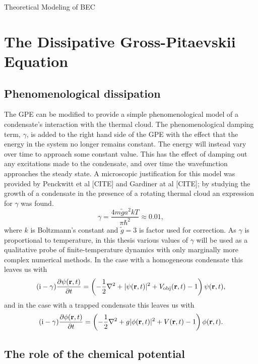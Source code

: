\begin{chapter}{\label{cha:theoretical_model}Theoretical Modeling of BEC}
\section{\label{section:gpe} The Dissipative Gross-Pitaevskii Equation}
	\subsection{\label{section:gamma} Phenomenological dissipation}
	The GPE can be modified to provide a simple phenomenological model of a condensate's interaction with the thermal cloud. The phenomenological damping term, $\gamma$, is added to the right hand side of the GPE with the effect that the energy in the system no longer remains constant. The energy will instead vary over time to approach some constant value. This has the effect of damping out any excitations made to the condensate, and over time the wavefunction approaches the steady state. A microscopic justification for this model was provided by Penckwitt et al [CITE] and Gardiner at al [CITE]; by studying the growth of a condensate in the presence of a rotating thermal cloud an expression for $\gamma$ was found.
		\begin{equation}\label{eq:dissgamma}
		\gamma = \frac{4m\tilde{g}a^2kT}{\pi\hbar^2} \approx 0.01,
		\end{equation}
	where $k$ is Boltzmann's constant and $\tilde{g} = 3$ is factor used for correction. As $\gamma$ is proportional to temperature, in this thesis various values of $\gamma$ will be used as a qualitative probe of finite-temperature dynamics with only marginally more complex numerical methods.
	In the case with a homogeneous condensate this leaves us with
		\begin{equation}\label{eq:dissgpehomg}
		(\mathrm{i} - \gamma)\frac{\partial\psi({\bf r},t)}{\partial t} = \left( -\frac{1}{2}\nabla^2 + |\psi({\bf r},t)|^2 + V_{\mathrm{obj}}({\bf r},t) - 1 \right) \psi({\bf r},t),
		\end{equation}
	and in the case with a trapped condensate this leaves us with
		\begin{equation}\label{eq:dissgpetrapped}
		(\mathrm{i}-\gamma)\frac{\partial\phi({\bf r},t)}{\partial t} = \left( -\frac{1}{2}\nabla^2 + g|\phi({\bf r},t)|^2 + V({\bf r},t) - 1 \right) \phi({\bf r},t).
		\end{equation}

	\subsection{\label{section:mu} The role of the chemical potential}

\end{chapter}
